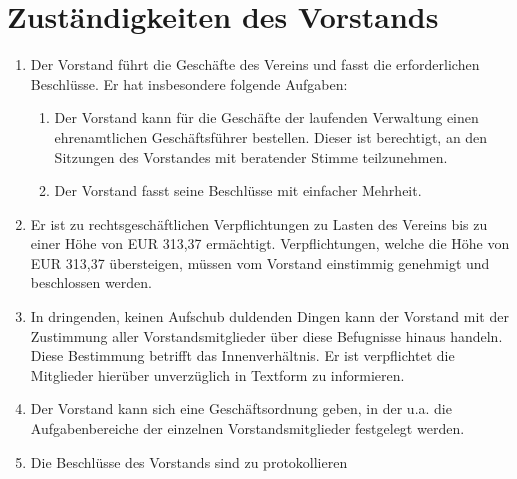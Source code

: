 \documentclass[a4paper,ngerman]{scrartcl}
\begin{document}
\section{Zuständigkeiten des Vorstands}
\begin{enumerate}
\item Der Vorstand führt die Geschäfte des Vereins und fasst die erforderlichen Beschlüsse. Er hat insbesondere folgende Aufgaben:
\begin{enumerate}
\item Der Vorstand kann für die Geschäfte der laufenden Verwaltung einen ehrenamtlichen Geschäftsführer bestellen. Dieser ist berechtigt, an den Sitzungen des Vorstandes mit beratender Stimme teilzunehmen.
\item Der Vorstand fasst seine Beschlüsse mit einfacher Mehrheit.
\end{enumerate}
\item Er ist zu rechtsgeschäftlichen Verpflichtungen zu Lasten des Vereins bis zu einer Höhe von EUR 313,37 ermächtigt. Verpflichtungen, welche die Höhe von EUR 313,37 übersteigen, müssen vom Vorstand einstimmig genehmigt und beschlossen werden.
\item In dringenden, keinen Aufschub duldenden Dingen kann der Vorstand mit der Zustimmung aller Vorstandsmitglieder über diese Befugnisse hinaus handeln. Diese Bestimmung betrifft das Innenverhältnis. Er ist verpflichtet die Mitglieder hierüber unverzüglich in Textform zu informieren.
\item Der Vorstand kann sich eine Geschäftsordnung geben, in der u.a. die Aufgabenbereiche der einzelnen Vorstandsmitglieder festgelegt werden.
\item Die Beschlüsse des Vorstands sind zu protokollieren
\end{enumerate}
\end{document}
